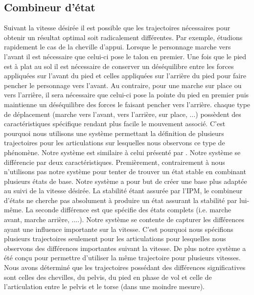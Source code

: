 \documentclass[runningheads,a4paper]{llncs}
\begin{document}
\subsection{Combineur d'état}
\label{sec:multi_state}
%
Suivant la vitesse désirée il est possible que les trajectoires nécessaires pour obtenir un résultat optimal soit radicalement différentes. Par exemple, étudions rapidement le cas de la cheville d'appui. Lorsque le personnage marche vers l'avant il est nécessaire que celui-ci pose le talon en premier. Une fois que le pied est à plat au sol il est nécessaire de conserver un déséquilibre entre les forces appliquées sur l'avant du pied et celles appliquées sur l'arrière du pied pour faire pencher le personnage vers l'avant. Au contraire, pour une marche sur place ou vers l'arrière, il sera nécessaire que celui-ci pose la pointe du pied en premier puis maintienne un déséquilibre des forces le faisant pencher vers l'arrière. chaque type de déplacement (marche vers l'avant, vers l'arrière, sur place, ...) possèdent des caractéristiques spécifique rendant plus facile le mouvement associé. C'est pourquoi nous utilisons une système permettant la définition de plusieurs trajectoires pour les articulations sur lesquelles nous observons ce type de phénomène. Notre système est similaire à celui présenté par \cite{coros2009robust}. Notre système se différencie par deux caractéristiques. Premièrement, contrairement à \cite{coros2009robust} nous n'utilisons pas notre système pour tenter de trouver un état stable en combinant plusieurs états de base. Notre système a pour but de créer une base plus adaptée au suivi de la vitesse désirée. La stabilité étant assurée par l'IPM, le combineur d'états ne cherche pas absolument à produire un état assurant la stabilité par lui-même. La seconde différence est que \cite{coros2009robust} spécifie des états complets (i.e. marche avant, marche arrière, ....). Notre système se contente de capturer les différences ayant une influence importante sur la vitesse. C'est pourquoi nous spécifions plusieurs trajectoires seulement pour les articulations pour lesquelles nous observons des différences importantes suivant la vitesse. De plus notre système a été conçu pour permettre d'utiliser la même trajectoire pour plusieurs vitesses. Nous avons déterminé que les trajectoires possédant des différences significatives sont celles des chevilles, du pelvis, du pied en phase de vol et celle de l'articulation entre le pelvis et le torse (dans une moindre mesure). 
\end{document}
